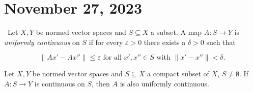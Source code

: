 \newpage
\section{November 27, 2023}
\begin{definition}
    \ Let \( X, Y \) be normed vector spaces and \( S \subseteq X \) a subset. A map \( A: S \to Y \) is \emph{uniformly continuous} on \( S \) if for every \( \varepsilon > 0 \) there exists a \( \delta > 0 \) such that 

    \[ \|A x' - A x''\| \leq \varepsilon \text{ for all } x', x'' \in S \text{ with } \|x' - x''\| < \delta. \]
\end{definition}

\begin{theorem}
Let \( X, Y \) be normed vector spaces and \( S \subseteq X \) a compact subset of \( X \), \( S \neq \emptyset \). If \( A: S \to Y \) is continuous on \( S \), then \( A \) is also uniformly continuous.
\end{theorem}